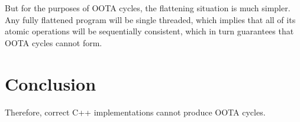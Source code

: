 \documentclass[10]{article}
\begin{document}
But for the purposes of OOTA cycles, the flattening situation is
much simpler.
Any fully flattened program will be single threaded, which implies
that all of its atomic operations will be sequentially consistent,
which in turn guarantees that OOTA cycles cannot form.

\section{Conclusion}
\label{sec:Conclusion}

Therefore, correct C++ implementations cannot produce OOTA cycles.




\end{document}
